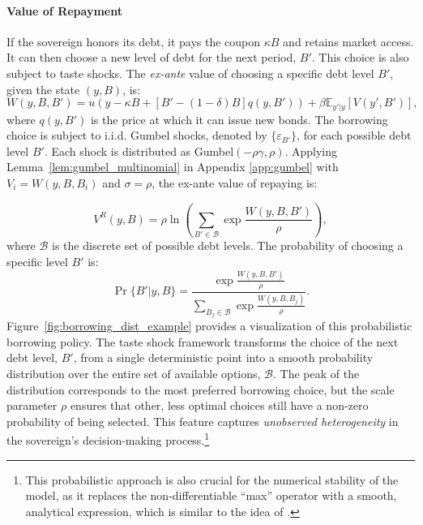 \documentclass[12pt]{article}
\theoremstyle{plain}
\begin{document}
\paragraph{Value of Repayment }
If the sovereign honors its debt, it pays the coupon $\kappa B$ and retains
market access. It can then choose a new level of debt for the next period,
$B'$. This choice is also subject to taste shocks. The \emph{ex-ante} value of
choosing a specific debt level $B'$, given the state $(y, B)$, is:
\begin{equation}
	W(y, B, B') = u\left(y - \kappa B + \left[B' - (1-\delta)B\right] q(y, B')\right) + \beta \mathbb{E}_{y'|y} \left[V(y', B')\right],
\end{equation}
where $q(y, B')$ is the price at which it can issue new bonds. The borrowing choice is subject to i.i.d. Gumbel shocks, denoted by
$\{\varepsilon_{B'}\}$, for each possible debt level $B'$. Each shock is
distributed as Gumbel$(-\rho\gamma, \rho)$. Applying Lemma~\ref{lem:gumbel_multinomial} in Appendix \ref{app:gumbel} with $V_i = W(y, B, B_i)$ and
$\sigma = \rho$, the ex-ante value of repaying is:

\begin{equation}\label{eq:Vr}
	V^R(y, B) = \rho \ln\left( \sum_{B' \in \mathcal{B}} \exp\frac{W(y, B, B')}{\rho} \right),
\end{equation}
where $\mathcal{B}$ is the discrete set of possible debt levels. The probability of choosing a specific level $B'$ is:
\begin{equation}
	\Pr\{B' | y, B\} = \frac{\exp\frac{W(y, B, B')}{\rho}}{\sum_{B_j \in \mathcal{B}}\exp\frac{W(y, B, B_j)}{\rho}}.
\end{equation}
Figure~\ref{fig:borrowing_dist_example} provides a visualization of this
probabilistic borrowing policy. The taste shock framework transforms the choice
of the next debt level, $B'$, from a single deterministic point into a smooth
probability distribution over the entire set of available options,
$\mathcal{B}$. The peak of the distribution corresponds to the most preferred
borrowing choice, but the scale parameter $\rho$ ensures that other, less
optimal choices still have a non-zero probability of being selected. This
feature captures \textit{unobserved heterogeneity} in the sovereign's
decision-making process.\footnote{This probabilistic approach is also crucial
	for the numerical stability of the model, as it replaces the non-differentiable
	``max'' operator with a smooth, analytical expression, which is similar to the idea of \citet{ChatterjeeEyigungor2012}.}
\end{document}
